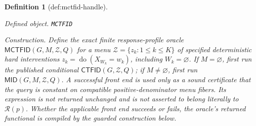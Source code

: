 \documentclass{article}
\newtheorem{definition}{Definition}
\begin{document}
\begin{definition}[def:mctfid-handle]\label{def:mctfid-handle}
\par\smallskip\noindent\emph{Defined object.} \texttt{MCTFID}
\par\smallskip\noindent\emph{Construction.} Define the exact finite response-profile oracle \(\mathsf{MCTFID}(G,M,\mathcal Z,Q)\) for a menu \(\mathcal Z=\{z_k:1\le k\le K\}\) of specified deterministic hard interventions \(z_k=\operatorname{do}(X_{W_k}=w_k)\), including \(W_k=\varnothing\).  If \(M=\varnothing\), first run the published conditional \(\mathsf{CTFID}(G,\mathcal Z,Q)\); if \(M\ne\varnothing\), first run \(\mathsf{MID}(G,M,\mathcal Z,Q)\).  A successful front end is used only as a sound certificate that the query is constant on compatible positive-denominator menu fibers.  Its expression is not returned unchanged and is not asserted to belong literally to \(\mathcal R(p)\).  Whether the applicable front end succeeds or fails, the oracle's returned functional is compiled by the guarded construction below.


\end{definition}
\end{document}
